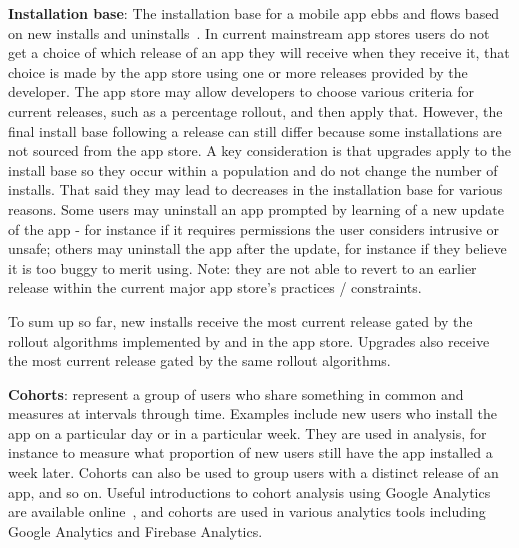 \textbf{Installation base}: The installation base for a mobile app ebbs and flows based on new installs and uninstalls~. In current mainstream app stores users do not get a choice of which release of an app they will receive when they receive it, that choice is made by the app store using one or more releases provided by the developer. The app store may allow developers to choose various criteria for current releases, such as a percentage rollout, and then apply that. However, the final install base following a release can still differ because some installations are not sourced from the app store. A key consideration is that upgrades apply to the install base so they occur within a population and do not change the number of installs. That said they may lead to decreases in the installation base for various reasons. Some users may uninstall an app prompted by learning of a new update of the app - for instance if it requires permissions the user considers intrusive or unsafe; others may uninstall the app after the update, for instance if they believe it is too buggy to merit using. Note: they are not able to revert to an earlier release within the current major app store's practices / constraints. 

To sum up so far, new installs receive the most current release gated by the rollout algorithms implemented by and in the app store. Upgrades also receive the most current release gated by the same rollout algorithms.

\textbf{Cohorts}: represent a group of users who share something in common and measures at intervals through time. Examples include new users who install the app on a particular day or in a particular week. They are used in analysis, for instance to measure what proportion of new users still have the app installed a week later. Cohorts can also be used to group users with a distinct release of an app, and so on. Useful introductions to cohort analysis using Google Analytics are available online~, and cohorts are used in various analytics tools including Google Analytics and Firebase Analytics. 



